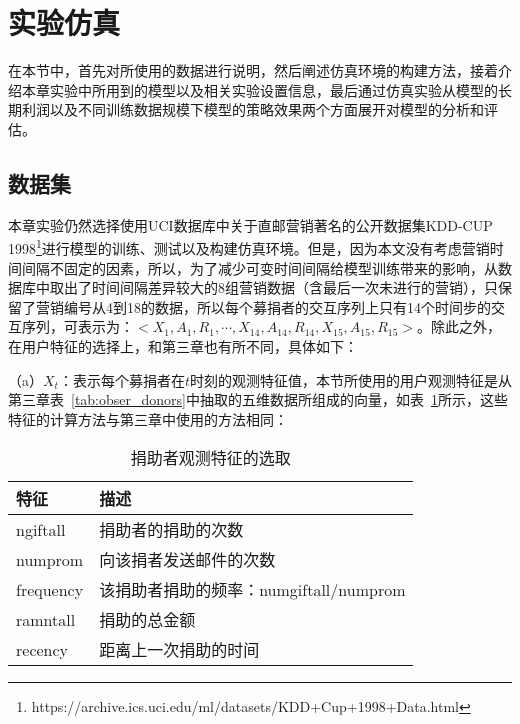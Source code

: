 \section{实验仿真}
在本节中，首先对所使用的数据进行说明，然后阐述仿真环境的构建方法，接着介绍本章实验中所用到的模型以及相关实验设置信息，最后通过仿真实验从模型的长期利润以及不同训练数据规模下模型的策略效果两个方面展开对模型的分析和评估。

\subsection{数据集}
本章实验仍然选择使用UCI数据库中关于直邮营销著名的公开数据集KDD-CUP 1998\footnote{https://archive.ics.uci.edu/ml/datasets/KDD+Cup+1998+Data.html}进行模型的训练、测试以及构建仿真环境。但是，因为本文没有考虑营销时间间隔不固定的因素，所以，为了减少可变时间间隔给模型训练带来的影响，从数据库中取出了时间间隔差异较大的8组营销数据（含最后一次未进行的营销），只保留了营销编号从4到18的数据，所以每个募捐者的交互序列上只有14个时间步的交互序列，可表示为：$<X_{1},A_{1},R_{1},\cdots,X_{14},A_{14},R_{14},X_{15},A_{15},R_{15}>$。除此之外，在用户特征的选择上，和第三章也有所不同，具体如下：


（a）$X_{t}$：表示每个募捐者在$t$时刻的观测特征值，本节所使用的用户观测特征是从第三章表~\ref{tab:obser_donors}中抽取的五维数据所组成的向量，如表~\ref{tab:obser_donors4}所示，这些特征的计算方法与第三章中使用的方法相同：
\begin{table}[htbp]
  \centering
  \caption{捐助者观测特征的选取}
  \label{tab:obser_donors4}
  \begin{tabular}{ll}
    \toprule
      特征 & 描述 \\
    \midrule
      ngiftall & 捐助者的捐助的次数 \\
      numprom & 向该捐者发送邮件的次数 \\
      frequency & 该捐助者捐助的频率：numgiftall/numprom\\
      ramntall & 捐助的总金额 \\
      recency & 距离上一次捐助的时间 \\
    \bottomrule
  \end{tabular}
\end{table}

